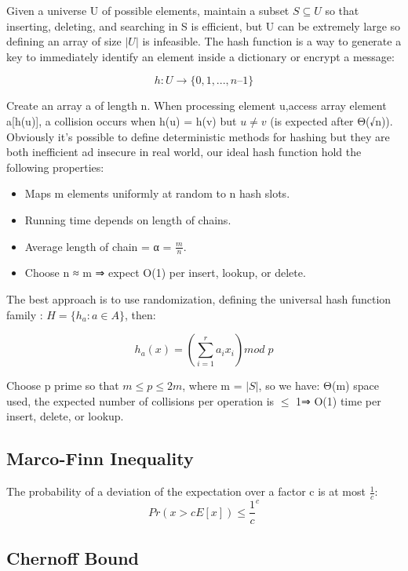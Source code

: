 \documentclass[11pt]{article}
\begin{document}
Given a universe U of possible elements, maintain a subset $S \subseteq U$ so that inserting, deleting, and searching in S is efficient, but U can be extremely large so defining an array of size $| U |$ is infeasible.
The hash function is a way to generate a key to immediately identify an element inside a dictionary or encrypt a message:

\[h : U \rightarrow \{ 0, 1, ..., n – 1 \}\]

Create an array a of length n. When processing element u,access array element a[h(u)], a collision occurs when h(u) = h(v) but $u \neq v$ (is expected after Θ(√n)).\\
Obviously it's possible to define deterministic methods for hashing but they are both inefficient ad insecure in real world, our ideal hash function hold the following properties:\\

\begin{itemize}

\item{Maps m elements uniformly at random to n hash slots.}
\item{Running time depends on length of chains.}
\item{Average length of chain = α = $\frac{m}{n}$.}
\item{Choose n ≈ m ⇒ expect O(1) per insert, lookup, or delete.}

\end{itemize}

The best approach is to use randomization, defining the universal hash function family : $H = \{ h_{a} : a \in A \}$, then:

\[h_{a}(x) = (\sum_{i=1}^{r}a_{i}x_{i}) mod \;p\]

Choose p prime so that $m \leq p \leq 2m$, where m = $| S |$, so we have: Θ(m) space used, the expected number of collisions per operation is $\leq$ 1⇒ O(1) time per insert, delete, or lookup.

\subsection{Marco-Finn Inequality}
The probability of a deviation of the expectation over a factor c is at most $\frac{1}{c}$:
\[ Pr(x>cE[x]) \leq \frac{1}{c}^{c}\]

\subsection{Chernoff Bound}
\end{document}
